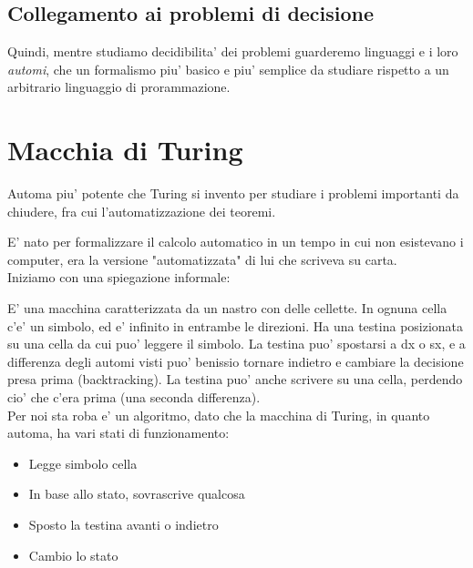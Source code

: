 \subsection{Collegamento ai problemi di decisione}


Quindi, mentre studiamo decidibilita' dei problemi guarderemo linguaggi e i loro \textit{automi}, che un formalismo piu' basico e piu' semplice da studiare rispetto a un arbitrario linguaggio di prorammazione.

\section{Macchia di Turing}
Automa piu' potente che Turing si invento per studiare i problemi importanti da chiudere, fra cui l'automatizzazione dei teoremi.

E' nato per formalizzare il calcolo automatico in un tempo in cui non esistevano i computer, era la versione "automatizzata" di lui che scriveva su carta.\\

Iniziamo con una spiegazione informale:

E' una macchina caratterizzata da un nastro con delle cellette. In ognuna cella c'e' un simbolo, ed e' infinito in entrambe le direzioni. Ha una testina posizionata su una cella da cui puo' leggere il simbolo. La testina puo' spostarsi a dx o sx, e a differenza degli automi visti puo' benissio tornare indietro e cambiare la decisione presa prima (backtracking). La testina puo' anche scrivere su una cella, perdendo cio' che c'era prima (una seconda differenza).\\

Per noi sta roba e' un algoritmo, dato che la macchina di Turing, in quanto automa, ha vari stati di funzionamento:
\begin{itemize}
\item Legge simbolo cella
\item In base allo stato, sovrascrive qualcosa
\item Sposto la testina avanti o indietro
\item Cambio lo stato
\end{itemize}

